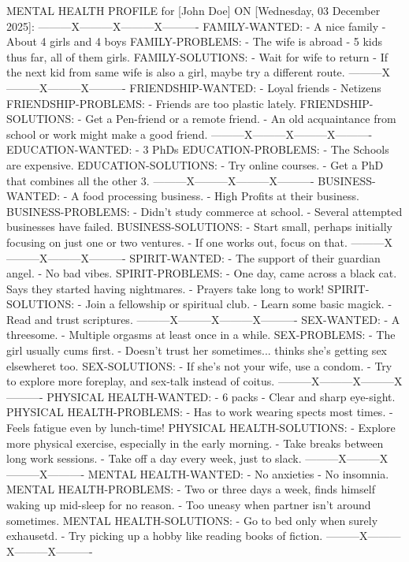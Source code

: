 \documentclass[a4paper, 18pt]{book} %
\begin{document}
{
\small
  \begin{tcbverbatim}[title=Sample Output from HDP HEALTH DIAGNOSIS]
MENTAL HEALTH PROFILE for [John Doe] ON [Wednesday, 03 December 2025]:
---------X---------X---------X----------
FAMILY-WANTED: 
- A nice family
- About 4 girls and 4 boys
FAMILY-PROBLEMS: 
- The wife is abroad
- 5 kids thus far, all of them girls.
FAMILY-SOLUTIONS: 
- Wait for wife to return
- If the next kid from same wife is also a girl, maybe try a different route.
---------X---------X---------X----------
FRIENDSHIP-WANTED: 
- Loyal friends
- Netizens
FRIENDSHIP-PROBLEMS: 
- Friends are too plastic lately.
FRIENDSHIP-SOLUTIONS: 
- Get a Pen-friend or a remote friend.
- An old acquaintance from school or work might make a good friend.
---------X---------X---------X----------
EDUCATION-WANTED: 
- 3 PhDs
EDUCATION-PROBLEMS: 
- The Schools are expensive.
EDUCATION-SOLUTIONS: 
- Try online courses.
- Get a PhD that combines all the other 3.
---------X---------X---------X----------
BUSINESS-WANTED: 
- A food processing business.
- High Profits at their business.
BUSINESS-PROBLEMS: 
- Didn't study commerce at school.
- Several attempted businesses have failed.
BUSINESS-SOLUTIONS: 
- Start small, perhaps initially focusing on just one or two ventures.
- If one works out, focus on that.
---------X---------X---------X----------
SPIRIT-WANTED: 
- The support of their guardian angel.
- No bad vibes.
SPIRIT-PROBLEMS: 
- One day, came across a black cat. Says they started having nightmares.
- Prayers take long to work!
SPIRIT-SOLUTIONS: 
- Join a fellowship or spiritual club.
- Learn some basic magick.
- Read and trust scriptures.
---------X---------X---------X----------
SEX-WANTED: 
- A threesome.
- Multiple orgasms at least once in a while.
SEX-PROBLEMS: 
- The girl usually cums first.
- Doesn't trust her sometimes... thinks she's getting sex elsewheret too.
SEX-SOLUTIONS: 
- If she's not your wife, use a condom.
- Try to explore more foreplay, and sex-talk instead of coitus.
---------X---------X---------X----------
PHYSICAL HEALTH-WANTED: 
- 6 packs
- Clear and sharp eye-sight.
PHYSICAL HEALTH-PROBLEMS: 
- Has to work wearing spects most times.
- Feels fatigue even by lunch-time!
PHYSICAL HEALTH-SOLUTIONS: 
- Explore more physical exercise, especially in the early morning.
- Take breaks between long work sessions.
- Take off a day every week, just to slack.
---------X---------X---------X----------
MENTAL HEALTH-WANTED: 
- No anxieties 
- No insomnia.
MENTAL HEALTH-PROBLEMS: 
- Two or three days a week, finds himself waking up mid-sleep for no reason.
- Too uneasy when partner isn't around sometimes.
MENTAL HEALTH-SOLUTIONS: 
- Go to bed only when surely exhausetd.
- Try picking up a hobby like reading books of fiction.
---------X---------X---------X----------
  \end{tcbverbatim}

}
\end{document}
